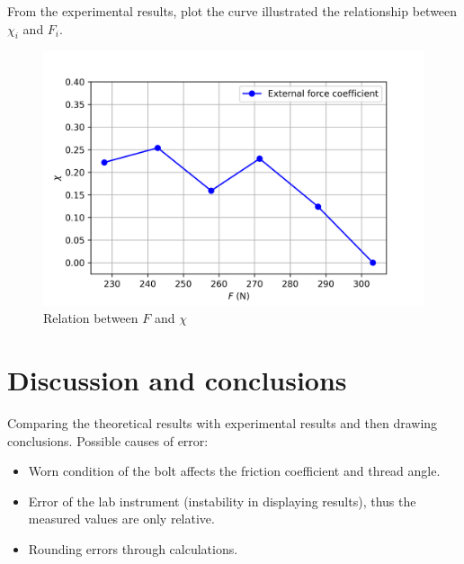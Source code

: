 From the experimental results, plot the curve illustrated the relationship between $ \chi_i $ and $ F_i $.
\begin{figure}
	\centering
	\includegraphics[width=150mm]{exp4.png}
	\caption{Relation between $ F $ and $ \chi $}
	\label{label}
\end{figure}
\section{Discussion and conclusions}
Comparing the theoretical results with experimental results and then drawing conclusions.
Possible causes of error:
\begin{itemize}
	\item Worn condition of the bolt affects the friction coefficient and thread angle.
	\item Error of the lab instrument (instability in displaying results), thus the measured values are only relative.
	\item  Rounding errors through calculations.
\end{itemize}


